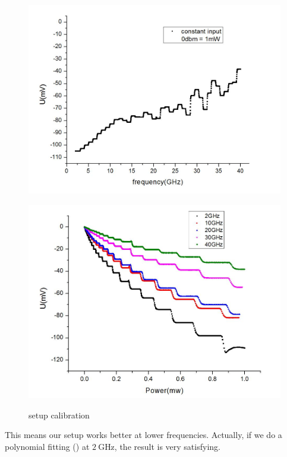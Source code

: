 \documentclass[12pt]{ruthesis}
\begin{document}
\begin{figure}[!htb]\centering
   \begin{minipage}{0.49\textwidth}
     \includegraphics[width=\linewidth]{figures/spec.JPG}
     \label{spec}
   \end{minipage}
   \begin {minipage}{0.49\textwidth}
     \includegraphics[width=\linewidth]{figures/multifre.JPG}
     \label{multifre}
   \end{minipage}
   \caption{setup calibration}
\end{figure}


 
This means our setup works better at lower frequencies. 
Actually, if we do a polynomial fitting () at $\SI{2}{\giga \hertz}$, the result is very satisfying. 
 
\end{document}
